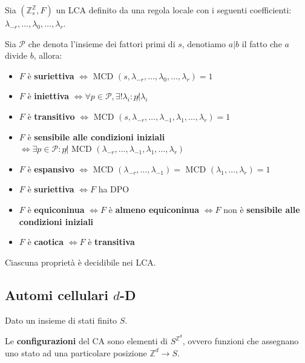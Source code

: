 \begin{teorema}
    Sia $(\mathbb{Z}_s^\mathbb{Z}, F)$ un LCA definito da una regola locale con i 
    seguenti coefficienti: $\lambda_{-r}, \dots,\lambda_0,\dots,\lambda_r$.

    Sia $\mathcal{P}$ che denota l'insieme dei fattori primi di $s$, denotiamo $a|b$
    il fatto che $a$ divide $b$, allora:
    \begin{itemize}
        \item $F$ è \textbf{suriettiva} $\iff\text{ MCD }(s,\lambda_{-r}, \dots,\lambda_0,\dots,\lambda_r) = 1$
        \item $F$ è \textbf{iniettiva} $\iff \forall p\in \mathcal{P}, \exists !\lambda_i: p\not |\lambda_i$
        \item $F$ è \textbf{transitivo} $\iff\text{ MCD }(s,\lambda_{-r}, \dots,\lambda_{-1},\lambda_{1},\dots,\lambda_r) = 1$
        \item $F$ è \textbf{sensibile alle condizioni iniziali} $\iff \exists  p\in \mathcal{P}: p\not |\text{ MCD }(\lambda_{-r}, \dots,\lambda_{-1},\lambda_{1},\dots,\lambda_r) $
        \item $F$ è \textbf{espansivo} $\iff \text{ MCD }(\lambda_{-r}, \dots,\lambda_{-1})=\text{ MCD }(\lambda_{1},\dots,\lambda_r)=1 $
        \item $F$ è \textbf{suriettiva} $\iff F$ ha DPO
        \item $F$ è \textbf{equiconinua} $\iff F$ è \textbf{almeno equiconinua} $\iff F$ non è \textbf{sensibile alle condizioni iniziali}
        \item $F$ è \textbf{caotica} $\iff F$ è \textbf{transitiva}
    \end{itemize}
\end{teorema}

\begin{teorema}
    Ciascuna proprietà è decidibile nei LCA.
\end{teorema}

\subsection{Automi cellulari $d$-D}
Dato un insieme di stati finito $S$.

\begin{definizione}
    Le \textbf{configurazioni} del CA sono elementi di $S^{\mathbb{Z}^d}$, ovvero
    funzioni che assegnano uno stato ad una particolare posizione $\mathbb{Z}^d\rightarrow S$.
\end{definizione}

